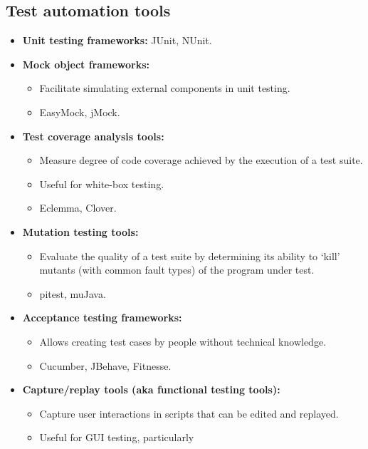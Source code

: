\documentclass[../ESOF_notes.tex]{subfiles}
\begin{document}
    \subsection{Test automation tools}
    \begin{itemize}
        \item \textbf{Unit testing frameworks:} JUnit, NUnit.
        \item \textbf{Mock object frameworks:}
        \begin{itemize}
            \item Facilitate simulating external components in unit testing.
            \item EasyMock, jMock.
        \end{itemize}
        \item \textbf{Test coverage analysis tools:}
        \begin{itemize}
            \item Measure degree of code coverage 
            achieved by the execution of a test suite.
            \item Useful for white-box testing.
            \item Eclemma, Clover.
        \end{itemize}
        \item \textbf{Mutation testing tools:}
        \begin{itemize}
            \item Evaluate the quality of a test suite by 
            determining its ability to ‘kill’ mutants
            (with common fault types) of the program under test.
            \item pitest, muJava.
        \end{itemize}
        \item \textbf{Acceptance testing frameworks:}
        \begin{itemize}
            \item Allows creating test cases by people 
            without technical knowledge.
            \item Cucumber, JBehave, Fitnesse.
        \end{itemize}
        \item \textbf{Capture/replay tools (aka functional testing tools):}
        \begin{itemize}
            \item Capture user interactions in scripts 
            that can be edited and replayed.
            \item Useful for GUI testing, particularly 

\end{itemize}
\end{itemize}
\end{document}
